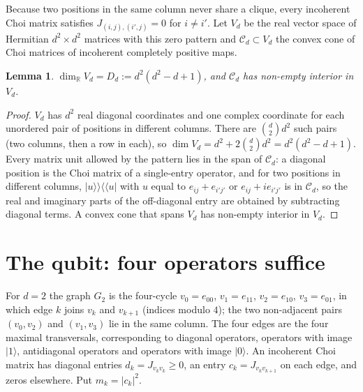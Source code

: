 \documentclass[11pt,a4paper]{article}
\newtheorem{lemma}[theorem]{Lemma}
\theoremstyle{definition}
\theoremstyle{plain}
\newcommand{\ket}[1]{\lvert#1\rangle}
\newcommand{\kket}[1]{\lvert#1\rangle\!\rangle}
\newcommand{\bbra}[1]{\langle\!\langle#1\rvert}
\newcommand{\R}{\mathbb{R}}
\begin{document}
Because two positions in the same column never share a clique, every
incoherent Choi matrix satisfies $J_{(i,j),(i',j)}=0$ for $i\ne i'$. Let
$V_d$ be the real vector space of Hermitian $d^2\times d^2$ matrices with this
zero pattern and $\mathcal C_d\subset V_d$ the convex cone of Choi matrices of
incoherent completely positive maps.

\begin{lemma}\label{lem:dim}
$\dim_\R V_d=D_d:=d^2(d^2-d+1)$, and $\mathcal C_d$ has non-empty interior
in $V_d$.
\end{lemma}
\begin{proof}
$V_d$ has $d^2$ real diagonal coordinates and one complex coordinate for each
unordered pair of positions in different columns. There are
$\binom d2d^2$ such pairs (two columns, then a row in each), so
$\dim V_d=d^2+2\binom d2d^2=d^2(d^2-d+1)$. Every matrix unit allowed by the
pattern lies in the span of $\mathcal C_d$: a diagonal position is the Choi
matrix of a single-entry operator, and for two positions in different
columns, $\kket u\bbra u$ with $u$ equal to $e_{ij}+e_{i'j'}$ or
$e_{ij}+ie_{i'j'}$ is in $\mathcal C_d$, so the real and imaginary parts of
the off-diagonal entry are obtained by subtracting diagonal terms. A convex
cone that spans $V_d$ has non-empty interior in $V_d$.
\end{proof}

\section{The qubit: four operators suffice}\label{sec:qubit}
For $d=2$ the graph $G_2$ is the four-cycle
$v_0=e_{00}$, $v_1=e_{11}$, $v_2=e_{10}$, $v_3=e_{01}$, in which edge $k$ joins
$v_k$ and $v_{k+1}$ (indices modulo $4$); the two non-adjacent pairs
$(v_0,v_2)$ and $(v_1,v_3)$ lie in the same column. The four edges are the
four maximal transversals, corresponding to diagonal operators, operators with
image $\ket1$, antidiagonal operators and operators with image $\ket0$. An
incoherent Choi matrix has diagonal entries $d_k=J_{v_kv_k}\ge0$, an entry
$c_k=J_{v_kv_{k+1}}$ on each edge, and zeros elsewhere. Put $m_k=|c_k|^2$.
\end{document}
